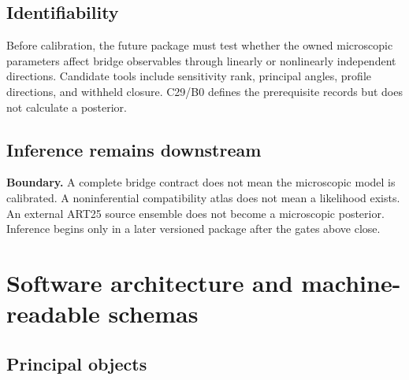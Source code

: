 \documentclass[11pt]{article}
\begin{document}
\subsection{Identifiability}

Before calibration, the future package must test whether the owned microscopic parameters affect bridge observables through linearly or nonlinearly independent directions.  Candidate tools include sensitivity rank, principal angles, profile directions, and withheld closure.  C29/B0 defines the prerequisite records but does not calculate a posterior.

\subsection{Inference remains downstream}

\begin{center}
\colorbox{softorange}{\parbox{0.88\textwidth}{
\textbf{Boundary.}
A complete bridge contract does not mean the microscopic model is calibrated.  A noninferential compatibility atlas does not mean a likelihood exists.  An external ART25 source ensemble does not become a microscopic posterior.  Inference begins only in a later versioned package after the gates above close.
}}
\end{center}

\section{Software architecture and machine-readable schemas}
\label{sec:architecture}

\subsection{Principal objects}
\end{document}
